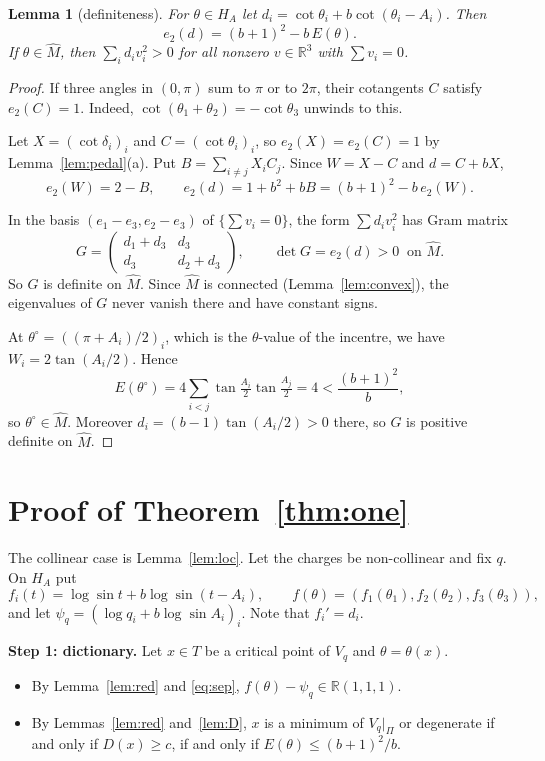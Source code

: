 \documentclass[11pt]{amsart}
\newtheorem{lemma}[theorem]{Lemma}
\theoremstyle{remark}
\newcommand{\R}{\mathbb{R}}
\begin{document}
\begin{lemma}[definiteness]\label{lem:def}
For $\theta\in H_A$ let $d_i=\cot\theta_i+b\cot(\theta_i-A_i)$. Then
\[
  e_2(d)=(b+1)^2-b\,E(\theta).
\]
If $\theta\in\widehat M$, then $\sum_id_iv_i^2>0$ for all nonzero $v\in\R^3$ with $\sum v_i=0$.
\end{lemma}

\begin{proof}
If three angles in $(0,\pi)$ sum to $\pi$ or to $2\pi$, their cotangents $C$ satisfy $e_2(C)=1$. Indeed,
$\cot(\theta_1+\theta_2)=-\cot\theta_3$ unwinds to this.

Let $X=(\cot\delta_i)_i$ and $C=(\cot\theta_i)_i$, so $e_2(X)=e_2(C)=1$ by Lemma~\ref{lem:pedal}(a). Put
$B=\sum_{i\ne j}X_iC_j$. Since $W=X-C$ and $d=C+bX$,
\[
  e_2(W)=2-B,\qquad e_2(d)=1+b^2+bB=(b+1)^2-b\,e_2(W).
\]

In the basis $(e_1-e_3,e_2-e_3)$ of $\{\sum v_i=0\}$, the form $\sum d_iv_i^2$ has Gram matrix
\[
  G=\begin{pmatrix}d_1+d_3&d_3\\ d_3&d_2+d_3\end{pmatrix},\qquad \det G=e_2(d)>0\ \text{ on }\widehat M .
\]
So $G$ is definite on $\widehat M$. Since $\widehat M$ is connected (Lemma~\ref{lem:convex}), the eigenvalues of $G$
never vanish there and have constant signs.

At $\theta^\circ=((\pi+A_i)/2)_i$, which is the $\theta$-value of the incentre, we have
$W_i=2\tan(A_i/2)$. Hence
\[
  E(\theta^\circ)=4\sum_{i<j}\tan\tfrac{A_i}2\tan\tfrac{A_j}2=4<\frac{(b+1)^2}{b},
\]
so $\theta^\circ\in\widehat M$. Moreover $d_i=(b-1)\tan(A_i/2)>0$ there, so $G$ is positive definite on $\widehat M$.
\end{proof}

\section{Proof of Theorem~\ref{thm:one}}\label{sec:proof1}

The collinear case is Lemma~\ref{lem:loc}. Let the charges be non-collinear and fix $q$. On $H_A$ put
\[
  f_i(t)=\log\sin t+b\log\sin(t-A_i),\qquad f(\theta)=(f_1(\theta_1),f_2(\theta_2),f_3(\theta_3)),
\]
and let $\psi_q=(\log q_i+b\log\sin A_i)_i$. Note that $f_i'=d_i$.

\medskip\noindent\textbf{Step 1: dictionary.} Let $x\in T$ be a critical point of $V_q$ and $\theta=\theta(x)$.
\begin{itemize}
\item By Lemma~\ref{lem:red} and \eqref{eq:sep}, $f(\theta)-\psi_q\in\R(1,1,1)$.
\item By Lemmas~\ref{lem:red} and~\ref{lem:D}, $x$ is a minimum of $V_q|_\Pi$ or degenerate if and only if
  $D(x)\ge c$, if and only if $E(\theta)\le(b+1)^2/b$.
\end{itemize}
\end{document}
